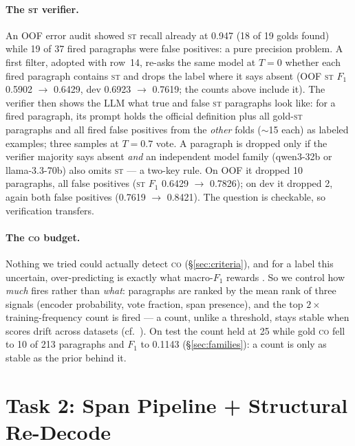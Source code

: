 \documentclass[11pt]{article}
\newcommand{\lab}[1]{\textsc{#1}}
\newcommand{\co}{\lab{co}}
\newcommand{\st}{\lab{st}}
\begin{document}
\paragraph{The \st{} verifier.} An OOF error audit showed \st{} recall
already at 0.947 (18 of 19 golds found) while 19 of 37 fired paragraphs
were false positives: a pure precision problem. A first filter, adopted
with row~14, re-asks the same model at $T{=}0$ whether each fired
paragraph contains \st{} and drops the label where it says absent (OOF
\st{} $F_1$ 0.5902 $\rightarrow$ 0.6429, dev 0.6923 $\rightarrow$
0.7619; the counts above include it). The verifier then shows the LLM
what true and false \st{} paragraphs look like: for a fired paragraph, its prompt holds the
official definition plus all gold-\st{} paragraphs and all fired false
positives from the \emph{other} folds ($\sim$15 each) as labeled
examples; three samples at $T{=}0.7$ vote. A paragraph is dropped only
if the verifier majority says absent \emph{and} an independent model
family (qwen3-32b or llama-3.3-70b) also omits \st{} --- a two-key rule.
On OOF it dropped 10 paragraphs, all false positives (\st{} $F_1$ 0.6429
$\rightarrow$ 0.7826); on dev it dropped 2, again both false positives
(0.7619 $\rightarrow$ 0.8421). The question is checkable, so
verification transfers.

\paragraph{The \co{} budget.} Nothing we tried could actually detect
\co{} (\S\ref{sec:criteria}), and for a label this uncertain,
over-predicting is exactly what macro-$F_1$ rewards
\citep{lipton-etal-2014-thresholding}. So we control how
\emph{much} fires rather than \emph{what}: paragraphs are ranked by the
mean rank of three signals (encoder probability, vote fraction, span
presence), and the top $2\times$ training-frequency count is fired --- a
count, unlike a threshold, stays stable when scores drift across
datasets (cf.\ \citealp{lin-lin-2023-thresholding}). On test the count
held at 25 while gold \co{} fell to 10 of 213 paragraphs and $F_1$ to
0.1143 (\S\ref{sec:families}): a count is only as stable as the prior
behind it.

\section{Task 2: Span Pipeline + Structural Re-Decode}
\label{sec:t2}
\end{document}
